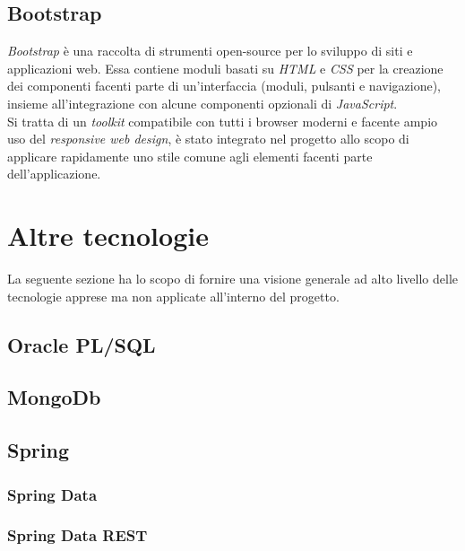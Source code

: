 \subsection{Bootstrap}
\textit{Bootstrap} è una raccolta di strumenti \gls{open-source} per lo sviluppo di siti e applicazioni web. Essa contiene moduli basati su \textit{HTML} e \textit{CSS} per la creazione dei componenti facenti parte di un'interfaccia (moduli, pulsanti e navigazione), insieme all'integrazione con alcune componenti opzionali di \textit{JavaScript}.\\
Si tratta di un \textit{toolkit} compatibile con tutti i browser moderni e facente ampio uso del \textit{responsive web design}, è stato integrato nel progetto allo scopo di applicare rapidamente uno stile comune agli elementi facenti parte dell'applicazione.

\section{Altre tecnologie}
La seguente sezione ha lo scopo di fornire una visione generale ad alto livello delle tecnologie apprese ma non applicate all'interno del progetto.

\subsection{Oracle PL/SQL}

\subsection{MongoDb}

\subsection{Spring}

\subsubsection{Spring Data}

\subsubsection{Spring Data REST}